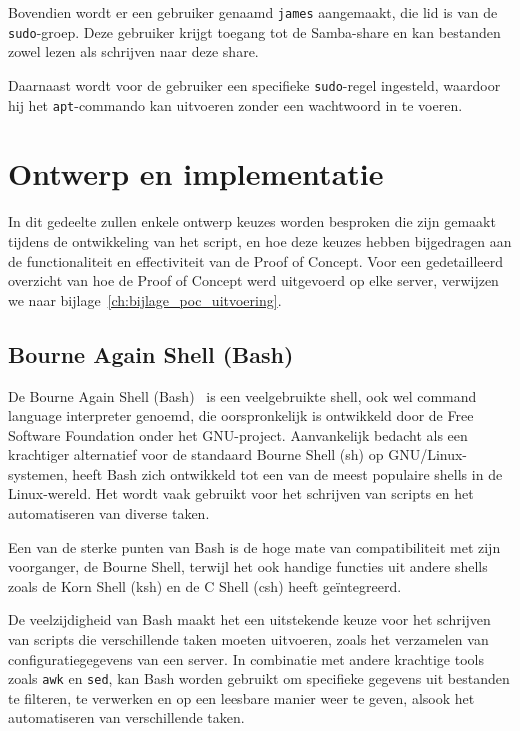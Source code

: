 Bovendien wordt er een gebruiker genaamd \texttt{james} aangemaakt, die lid is van de \texttt{sudo}-groep.
Deze gebruiker krijgt toegang tot de Samba-share en kan bestanden zowel lezen als schrijven naar deze share.

Daarnaast wordt voor de gebruiker een specifieke \texttt{sudo}-regel ingesteld, waardoor hij het \texttt{apt}-commando kan uitvoeren zonder een wachtwoord in te voeren.

\section{Ontwerp en implementatie}
\label{poc_ontwerp_implementatie}

In dit gedeelte zullen enkele ontwerp keuzes worden besproken die zijn gemaakt tijdens de ontwikkeling van het script, en hoe deze keuzes hebben bijgedragen aan de functionaliteit en effectiviteit van de Proof of Concept.
Voor een gedetailleerd overzicht van hoe de Proof of Concept werd uitgevoerd op elke server, verwijzen we naar bijlage~\ref{ch:bijlage_poc_uitvoering}.

\subsection{Bourne Again Shell (Bash)}
\label{poc_bash}

De Bourne Again Shell (Bash)~\autocite{gnu-bash-home} is een veelgebruikte shell, ook wel command language interpreter genoemd, die oorspronkelijk is ontwikkeld door de Free Software Foundation onder het GNU-project.
Aanvankelijk bedacht als een krachtiger alternatief voor de standaard Bourne Shell (sh) op GNU/Linux-systemen, heeft Bash zich ontwikkeld tot een van de meest populaire shells in de Linux-wereld.
Het wordt vaak gebruikt voor het schrijven van scripts en het automatiseren van diverse taken.

Een van de sterke punten van Bash is de hoge mate van compatibiliteit met zijn voorganger, de Bourne Shell, terwijl het ook handige functies uit andere shells zoals de Korn Shell (ksh) en de C Shell (csh) heeft ge\"integreerd.

De veelzijdigheid van Bash maakt het een uitstekende keuze voor het schrijven van scripts die verschillende taken moeten uitvoeren, zoals het verzamelen van configuratiegegevens van een server.
In combinatie met andere krachtige tools zoals \texttt{awk} en \texttt{sed}, kan Bash worden gebruikt om specifieke gegevens uit bestanden te filteren, te verwerken en op een leesbare manier weer te geven, alsook het automatiseren van verschillende taken.

